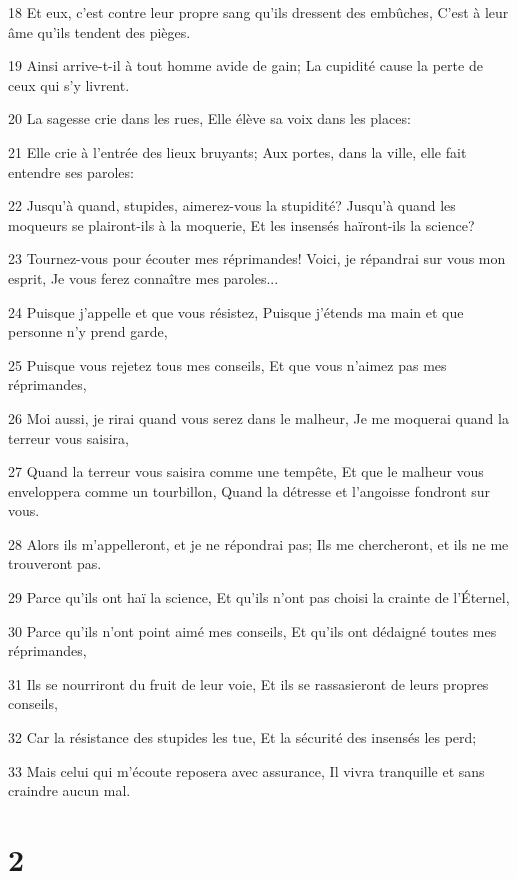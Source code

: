 \par 18 Et eux, c'est contre leur propre sang qu'ils dressent des embûches, C'est à leur âme qu'ils tendent des pièges.
\par 19 Ainsi arrive-t-il à tout homme avide de gain; La cupidité cause la perte de ceux qui s'y livrent.
\par 20 La sagesse crie dans les rues, Elle élève sa voix dans les places:
\par 21 Elle crie à l'entrée des lieux bruyants; Aux portes, dans la ville, elle fait entendre ses paroles:
\par 22 Jusqu'à quand, stupides, aimerez-vous la stupidité? Jusqu'à quand les moqueurs se plairont-ils à la moquerie, Et les insensés haïront-ils la science?
\par 23 Tournez-vous pour écouter mes réprimandes! Voici, je répandrai sur vous mon esprit, Je vous ferez connaître mes paroles...
\par 24 Puisque j'appelle et que vous résistez, Puisque j'étends ma main et que personne n'y prend garde,
\par 25 Puisque vous rejetez tous mes conseils, Et que vous n'aimez pas mes réprimandes,
\par 26 Moi aussi, je rirai quand vous serez dans le malheur, Je me moquerai quand la terreur vous saisira,
\par 27 Quand la terreur vous saisira comme une tempête, Et que le malheur vous enveloppera comme un tourbillon, Quand la détresse et l'angoisse fondront sur vous.
\par 28 Alors ils m'appelleront, et je ne répondrai pas; Ils me chercheront, et ils ne me trouveront pas.
\par 29 Parce qu'ils ont haï la science, Et qu'ils n'ont pas choisi la crainte de l'Éternel,
\par 30 Parce qu'ils n'ont point aimé mes conseils, Et qu'ils ont dédaigné toutes mes réprimandes,
\par 31 Ils se nourriront du fruit de leur voie, Et ils se rassasieront de leurs propres conseils,
\par 32 Car la résistance des stupides les tue, Et la sécurité des insensés les perd;
\par 33 Mais celui qui m'écoute reposera avec assurance, Il vivra tranquille et sans craindre aucun mal.

\chapter{2}

